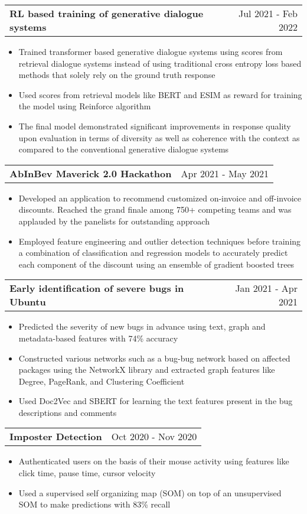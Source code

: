 \documentclass[letterpaper,11pt]{article}
\makeatletter
\newcommand{\resumeItem}[1]{
  \item\small{
    {#1 \vspace{-2pt}}
  }
}
\newcommand{\resumeProjectHeading}[2]{
    \item
    \begin{tabular*}{0.97\textwidth}{l@{\extracolsep{\fill}}r}
      \small#1 & #2 \\
    \end{tabular*}\vspace{-7pt}
}
\newcommand{\resumeItemListStart}{\begin{itemize}}
\newcommand{\resumeItemListEnd}{\end{itemize}\vspace{-5pt}}
\makeatother
\begin{document}
      \resumeProjectHeading
        {\textbf{RL based training of generative dialogue systems }}{Jul 2021 - Feb 2022}
        \resumeItemListStart
            \resumeItem{Trained transformer based generative dialogue systems using scores from retrieval dialogue systems instead of using traditional cross entropy loss based methods that solely rely on the ground truth response}
            \resumeItem{Used scores from retrieval models like BERT and ESIM as reward for training the model using Reinforce algorithm}
            \resumeItem{The final model demonstrated significant improvements in response quality upon evaluation in terms of diversity as well as coherence with the context as compared to the conventional generative dialogue systems}
        \resumeItemListEnd

      \resumeProjectHeading
        {\textbf{AbInBev Maverick 2.0 Hackathon }}{Apr 2021 - May 2021}
        \resumeItemListStart
            \resumeItem{Developed an application to recommend customized on-invoice and off-invoice discounts. Reached the grand finale among 750+ competing teams and was applauded by the panelists for outstanding approach}
            \resumeItem{Employed feature engineering and outlier detection techniques before training a combination of classification and regression models to accurately predict each component of the discount using an ensemble of gradient boosted trees}
        \resumeItemListEnd

      \resumeProjectHeading
        {\textbf{Early identification of severe bugs in Ubuntu}}{Jan 2021 - Apr 2021}
        \resumeItemListStart
            \resumeItem{Predicted the severity of new bugs in advance using text, graph and metadata-based features with 74\% accuracy }
            \resumeItem{Constructed various networks such as a bug-bug network based on affected packages using the NetworkX library and extracted graph features like Degree, PageRank, and Clustering Coefficient}
            \resumeItem{Used Doc2Vec and SBERT for learning the text features present in the bug descriptions and comments}
        \resumeItemListEnd

      \resumeProjectHeading
        {\textbf{Imposter Detection}}{Oct 2020 - Nov 2020}
        \resumeItemListStart
            \resumeItem{Authenticated users on the basis of their mouse activity using features like click time, pause time, cursor velocity}
            \resumeItem{Used a supervised self organizing map (SOM) on top of an unsupervised SOM to make predictions with 83\% recall}
        \resumeItemListEnd
        
\end{document}
